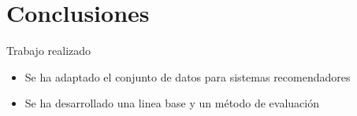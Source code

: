 \section{Conclusiones}
\begin{frame}{Trabajo realizado}
    \begin{itemize}
        \item Se ha adaptado el conjunto de datos para sistemas recomendadores
        \item Se ha desarrollado una linea base y un método de evaluación
    \end{itemize}
\end{frame}

\begin{frame}
    \fistrum[][1-3]
\end{frame}
